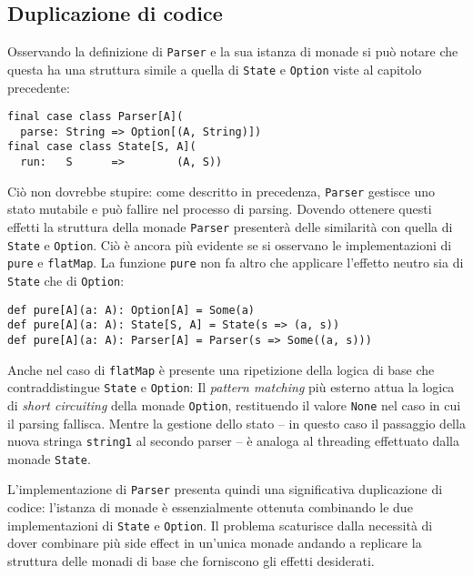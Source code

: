 \subsection{Duplicazione di codice}
Osservando la definizione di \lstinline{Parser} e la sua istanza di monade si può notare che questa ha una struttura simile a quella di \lstinline{State} e \lstinline{Option} viste al capitolo precedente:
\begin{lstlisting}[language=scala3]
final case class Parser[A](
  parse: String => Option[(A, String)])
final case class State[S, A](
  run:   S      =>        (A, S))
\end{lstlisting}
Ciò non dovrebbe stupire: come descritto in precedenza, \lstinline{Parser} gestisce uno stato mutabile e può fallire nel processo di parsing. Dovendo ottenere questi effetti la struttura della monade \lstinline{Parser} presenterà delle similarità con quella di \lstinline{State} e \lstinline{Option}. Ciò è ancora più evidente se si osservano le implementazioni di \lstinline{pure} e \lstinline{flatMap}. La funzione \lstinline{pure} non fa altro che applicare l'effetto neutro sia di \lstinline{State} che di \lstinline{Option}:
\begin{lstlisting}[language=scala3]
def pure[A](a: A): Option[A] = Some(a)
def pure[A](a: A): State[S, A] = State(s => (a, s))
def pure[A](a: A): Parser[A] = Parser(s => Some((a, s)))
\end{lstlisting}
Anche nel caso di \lstinline{flatMap} è presente una ripetizione della logica di base che contraddistingue \lstinline{State} e \lstinline{Option}:
Il \emph{pattern matching} più esterno attua la logica di \emph{short circuiting} della monade \lstinline{Option}, restituendo il valore \lstinline{None} nel caso in cui il parsing fallisca. Mentre la gestione dello stato -- in questo caso il passaggio della nuova stringa \lstinline{string1} al secondo parser -- è analoga al threading effettuato dalla monade \lstinline{State}.

L'implementazione di \lstinline{Parser} presenta quindi una significativa duplicazione di codice: l'istanza di monade è essenzialmente ottenuta combinando le due implementazioni di \lstinline{State} e \lstinline{Option}. Il problema scaturisce dalla necessità di dover combinare più side effect in un'unica monade andando a replicare la struttura delle monadi di base che forniscono gli effetti desiderati.

